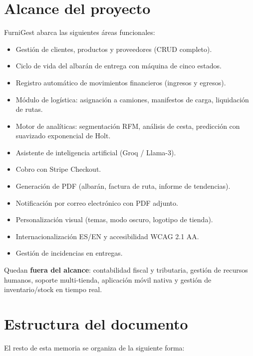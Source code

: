 \documentclass[12pt,twoside,titlepage]{report}
\begin{document}
\section{Alcance del proyecto}

FurniGest abarca las siguientes áreas funcionales:

\begin{itemize}[nosep]
  \item Gestión de clientes, productos y proveedores (CRUD completo).
  \item Ciclo de vida del albarán de entrega con máquina de cinco estados.
  \item Registro automático de movimientos financieros (ingresos y egresos).
  \item Módulo de logística: asignación a camiones, manifestos de carga, liquidación de rutas.
  \item Motor de analíticas: segmentación RFM, análisis de cesta, predicción con suavizado exponencial de Holt.
  \item Asistente de inteligencia artificial (Groq / Llama-3).
  \item Cobro con Stripe Checkout.
  \item Generación de PDF (albarán, factura de ruta, informe de tendencias).
  \item Notificación por correo electrónico con PDF adjunto.
  \item Personalización visual (temas, modo oscuro, logotipo de tienda).
  \item Internacionalización ES/EN y accesibilidad WCAG 2.1 AA.
  \item Gestión de incidencias en entregas.
\end{itemize}

Quedan \textbf{fuera del alcance}: contabilidad fiscal y tributaria, gestión de recursos humanos, soporte multi-tienda, aplicación móvil nativa y gestión de inventario/stock en tiempo real.

\section{Estructura del documento}

El resto de esta memoria se organiza de la siguiente forma:
\end{document}
